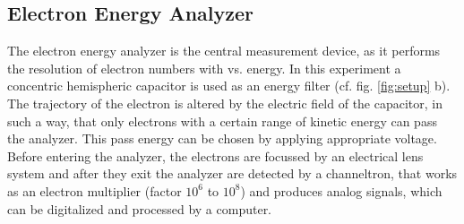 \documentclass[a4paper]{scrartcl}
\numberwithin{equation}{section}
\numberwithin{figure}{section}
\numberwithin{table}{section}
\begin{document}
\subsection{Electron Energy Analyzer}
The electron energy analyzer is the central measurement device, as it performs the resolution of electron numbers with vs. energy. In this experiment a concentric hemispheric capacitor is used as an energy filter (cf. fig. \ref{fig:setup} b). The trajectory of the electron is altered by the electric field of the capacitor, in such a way, that only electrons with a certain range of kinetic energy can pass the analyzer. This pass energy can be chosen by applying appropriate voltage. Before entering the analyzer, the electrons are focussed by an electrical lens system and after they exit the analyzer are detected by a channeltron, that works as an electron multiplier (factor $10^6$ to $10^8$) and produces analog signals, which can be digitalized and processed by a computer. 



\FloatBarrier
 

\end{document}
